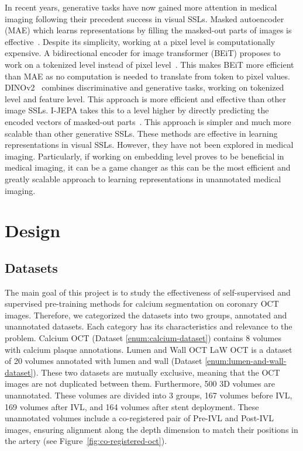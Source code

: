 \documentclass[a4paper,11pt,oneside]{report}
\begin{document}
In recent years, generative tasks have now gained more attention in medical imaging following their precedent success in visual SSLs. Masked autoencoder (MAE) which learns representations by filling the masked-out parts of images is effective~\cite{He2022}. Despite its simplicity, working at a pixel level is computationally expensive. A bidirectional encoder for image transformer (BEiT) proposes to work on a tokenized level instead of pixel level~\cite{Bao2022beit}. This makes BEiT more efficient than MAE as no computation is needed to translate from token to pixel values. DINOv2~\cite{Oquab2024dinov} combines discriminative and generative tasks, working on tokenized level and feature level. This approach is more efficient and effective than other image SSLs. I-JEPA takes this to a level higher by directly predicting the encoded vectors of masked-out parts~\cite{Assran2023}. This approach is simpler and much more scalable than other generative SSLs. These methods are effective in learning representations in visual SSLs. However, they have not been explored in medical imaging. Particularly, if working on embedding level proves to be beneficial in medical imaging, it can be a game changer as this can be the most efficient and greatly scalable approach to learning representations in unannotated medical imaging.


\chapter{Design}



\section{Datasets}\label{sec:design:datasets}
The main goal of this project is to study the effectiveness of self-supervised and supervised pre-training methods for calcium segmentation on coronary OCT images. Therefore, we categorized the datasets into two groups, annotated and unannotated datasets. Each category has its characteristics and relevance to the problem. Calcium OCT (Dataset \ref{enum:calcium-dataset}) contains 8 volumes with calcium plaque annotations. Lumen and Wall OCT LaW OCT is a dataset of 20 volumes annotated with lumen and wall (Dataset \ref{enum:lumen-and-wall-dataset}). These two datasets are mutually exclusive, meaning that the OCT images are not duplicated between them. Furthermore, 500 3D volumes are unannotated. These volumes are divided into 3 groups, 167 volumes before IVL, 169 volumes after IVL, and 164 volumes after stent deployment. These unannotated volumes include a co-registered pair of Pre-IVL and Post-IVL images, ensuring alignment along the depth dimension to match their positions in the artery (see Figure~\ref{fig:co-registered-oct}).
\end{document}
